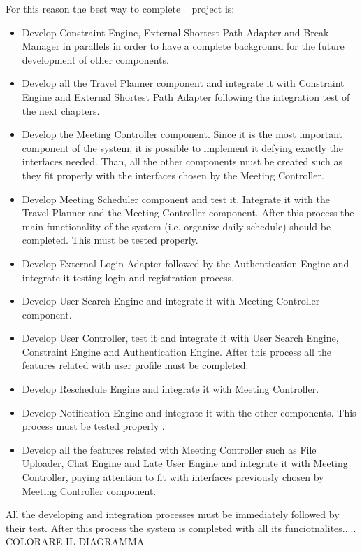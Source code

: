 For this reason the best way to complete \projectname~ project is:
\begin{itemize}
	\item Develop Constraint Engine, External Shortest Path Adapter and Break Manager in parallels in order to have a complete background for the future development of other components.
	\item Develop all the Travel Planner component and integrate it with Constraint Engine and External Shortest Path Adapter following the integration test of the next chapters.
	\item Develop the Meeting Controller component. Since it is the most important component of the system, it is possible to implement it defying exactly the interfaces needed. Than, all the other components must be created such as they fit properly with the interfaces chosen by the Meeting Controller. 
	\item Develop Meeting Scheduler component and test it. Integrate it with the Travel Planner and the Meeting Controller component. After this process the main functionality of the system (i.e. organize daily schedule) should be completed. This must be tested properly.
	\item Develop External Login Adapter followed by the Authentication Engine and integrate it testing login and registration process.
	\item Develop User Search Engine and integrate it with Meeting Controller component.
	\item Develop User Controller, test it and integrate it with User Search Engine, Constraint Engine and Authentication Engine. After this process all the features related with user profile must be completed.
	\item Develop Reschedule Engine and integrate it with Meeting Controller.
	\item Develop Notification Engine and integrate it with the other components. This process must be tested properly .
	\item Develop all the features related with Meeting Controller such as File Uploader, Chat Engine and Late User Engine and integrate it with Meeting Controller, paying attention to fit with interfaces previously chosen by Meeting Controller component.
\end{itemize}
All the developing and integration processes must be immediately followed by their test.
After this process the system is completed with all its funciotnalites..... COLORARE IL DIAGRAMMA

\clearpage